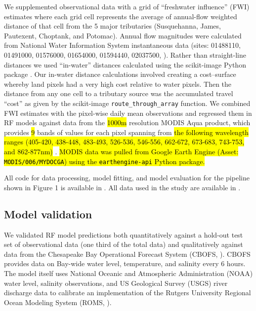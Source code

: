 \documentclass{article}
\begin{document}
We supplemented observational data with a grid of “freshwater influence” (FWI) estimates where each grid cell represents the average of annual-flow weighted distance of that cell from the 5 major tributaries (Susquehanna, James, Pautexent, Choptank, and Potomac). Annual flow magnitudes were calculated from National Water Information System instantaneous data (sites: 01488110, 01491000, 01576000, 01654000, 01594440, 02037500, \cite{nwis2021usgs}). Rather than straight-line distances we used “in-water” distances calculated using the scikit-image Python package \cite{littleKrigingEstuariesCrow1997,vanderwaltScikitimageImageProcessing2014}. Our in-water distance calculations involved creating a cost–surface whereby land pixels had a very high cost relative to water pixels. Then the distance from any one cell to a tributary source was the accumulated travel “cost” as given by the scikit-image \texttt{route\_through\_array} function. We combined FWI estimates with the pixel-wise daily mean observations and regressed them in RF models against data from the \hl{1000m} resolution MODIS Aqua product, which provides \hl{9} bands of values for each pixel spanning from \hl{the following wavelength ranges (405-420, 438-448, 483-493, 526-536, 546-556, 662-672, 673-683, 743-753, and 862-877nm)} \cite{vermoteericMOD09GAMODISTerra2015}. \hl{MODIS data was pulled from Google Earth Engine (Asset: \texttt{MODIS/006/MYDOCGA}) using the \texttt{earthengine-api} Python package.}

All code for data processing, model fitting, and model evaluation for the pipeline shown in Figure 1 is available in \cite{jemma_stachelek_2022_7332559}. All data used in the study are available in \cite{stachelekjemmachesapeake}.



\subsection{Model validation}

We validated RF model predictions both quantitatively against a hold-out test set of observational data (one third of the total data) and qualitatively against data from the Chesapeake Bay Operational Forecast System (CBOFS, \cite{lanerolle2011second}). CBOFS provides data on Bay-wide water level, temperature, and salinity every 6 hours. The model itself uses National Oceanic and Atmospheric Administration (NOAA) water level, salinity observations, and US Geological Survey (USGS) river discharge data to calibrate an implementation of the Rutgers University Regional Ocean Modeling System (ROMS, \cite{shchepetkinRegionalOceanicModeling2005}).
\end{document}
